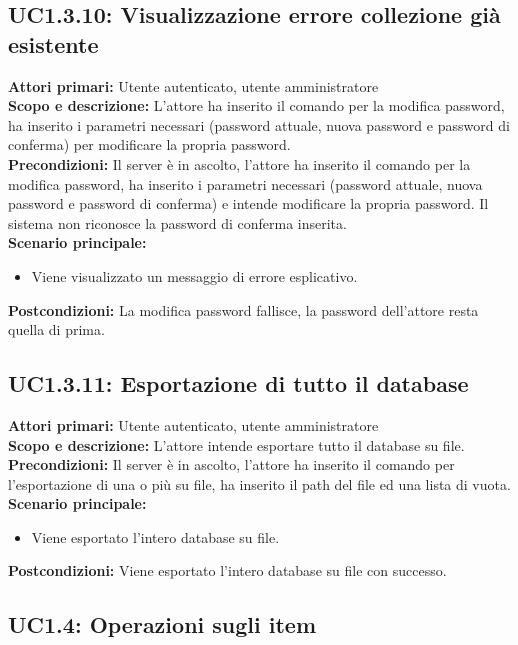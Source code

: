 \documentclass{scalatekids-article}
\begin{document}
\subsection{UC1.3.10: Visualizzazione errore collezione già esistente}

\textbf{Attori primari:} Utente autenticato, utente amministratore\\
\textbf{Scopo e descrizione:}
L'attore ha inserito il comando per la modifica password, ha inserito i parametri necessari (password attuale, nuova password e password di conferma) per modificare la propria password.\\
\textbf{Precondizioni:} Il server è in ascolto, l'attore ha inserito il comando per la modifica password, ha inserito i parametri necessari (password attuale, nuova password e password di conferma) e intende modificare la propria password. Il sistema non riconosce la password di conferma inserita.\\
\textbf{Scenario principale:}
\begin{itemize}
\item Viene visualizzato un messaggio di errore esplicativo.
\end{itemize}
\textbf{Postcondizioni:} La modifica password fallisce, la password dell'attore resta quella di prima.

\subsection{UC1.3.11: Esportazione di tutto il database}

\textbf{Attori primari:} Utente autenticato, utente amministratore\\
\textbf{Scopo e descrizione:}
L'attore intende esportare tutto il database su file.\\
\textbf{Precondizioni:} Il server è in ascolto, l'attore ha inserito il comando per l'esportazione di una o più  su file, ha inserito il path del file ed una lista di  vuota.\\
\textbf{Scenario principale:}
\begin{itemize}
\item Viene esportato l'intero database su file.
\end{itemize}
\textbf{Postcondizioni:} Viene esportato l'intero database su file con successo.

\subsection{UC1.4: Operazioni sugli item}
\end{document}
